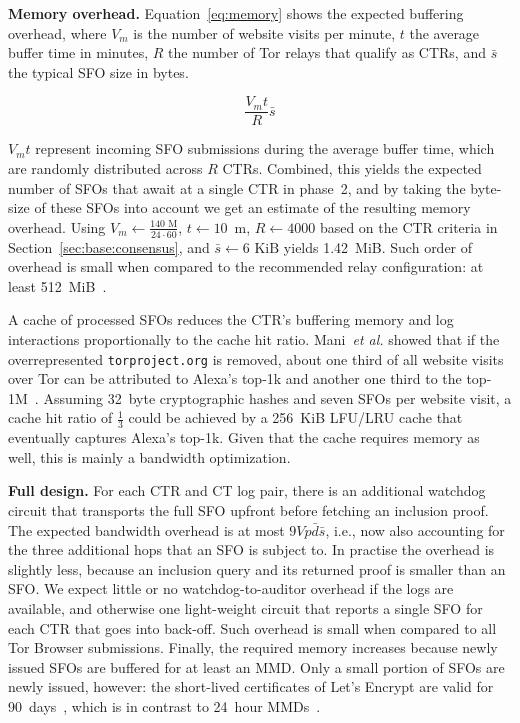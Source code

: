 \textbf{Memory overhead.}
Equation~\ref{eq:memory} shows the expected buffering overhead, where
	$V_m$ is the number of website visits per minute,
	$t$ the average buffer time in minutes,
	$R$ the number of Tor relays that qualify as CTRs, and
	$\bar{s}$ the typical SFO size in bytes.

\begin{equation} \label{eq:memory}
	\frac{V_mt}{R} \bar{s}
\end{equation}

$V_mt$ represent incoming SFO submissions during the average buffer time, which
are randomly distributed across $R$ CTRs.  Combined, this yields the expected
number of SFOs that await at a single CTR in phase~2, and by taking the
byte-size of these SFOs into account we get an estimate of the resulting memory
overhead.  Using
	$V_m \gets \frac{140\textrm{~M}}{24\cdot60}$,
	$t \gets 10$~m,
	$R \gets 4000$ based on the CTR criteria in
		Section~\ref{sec:base:consensus}, and
	$\bar{s} \gets 6\textrm{~KiB}$
yields 1.42~MiB.  Such order of overhead is small when compared to the
recommended relay configuration:
	at least 512~MiB~\cite{relay-config}.

A cache of processed SFOs reduces the CTR's buffering memory and log
interactions proportionally to the cache hit ratio.  Mani~\emph{et al.} showed
that if the overrepresented \texttt{torproject.org} is removed, about one third
of all website visits over Tor can be attributed to Alexa's top-1k and another
one third to the top-1M~\cite{mani}.
Assuming 32~byte cryptographic hashes and seven SFOs per website visit, a cache
hit ratio of $\frac{1}{3}$ could be achieved by a 256~KiB LFU/LRU cache that
eventually captures Alexa's top-1k.  Given that the cache requires memory as
well, this is mainly a bandwidth optimization.

\textbf{Full design.}
For each CTR and CT log pair, there is an additional watchdog circuit that
transports the full SFO upfront before fetching an inclusion proof.  The
expected bandwidth overhead is at most $9Vp\bar{d}\bar{s}$, i.e., now
also accounting for the three additional hops that an SFO is subject to.  In
practise the overhead is slightly less, because an inclusion query and its
returned proof is smaller than an SFO.  We expect little or no
watchdog-to-auditor overhead if the logs are available, and otherwise one
light-weight circuit that reports a single SFO for each CTR that goes into
back-off.  Such overhead is small when compared to all Tor Browser submissions.
Finally, the required memory increases because newly issued SFOs are buffered
for at least an MMD.  Only a small portion of SFOs are newly issued, however:
	the short-lived certificates of Let's Encrypt are valid for
	90~days~\cite{le}, which is in contrast to 24~hour
	MMDs~\cite{google-log-policy}.
